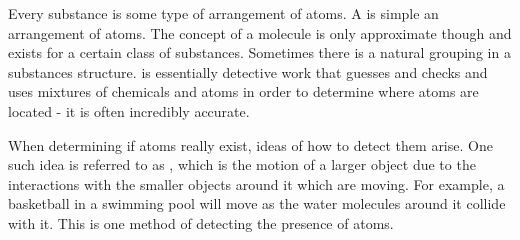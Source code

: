 Every substance is some type of arrangement of atoms. A  is simple an arrangement of atoms. The concept of a molecule is only approximate though and exists for a certain class of substances. Sometimes there is a natural grouping in a substances structure.  is essentially detective work that guesses and checks and uses mixtures of chemicals and atoms in order to determine where atoms are located - it is often incredibly accurate.

When determining if atoms really exist, ideas of how to detect them arise. One such idea is referred to as , which is the motion of a larger object due to the interactions with the smaller objects around it which are moving. For example, a basketball in a swimming pool will move as the water molecules around it collide with it. This is one method of detecting the presence of atoms.

